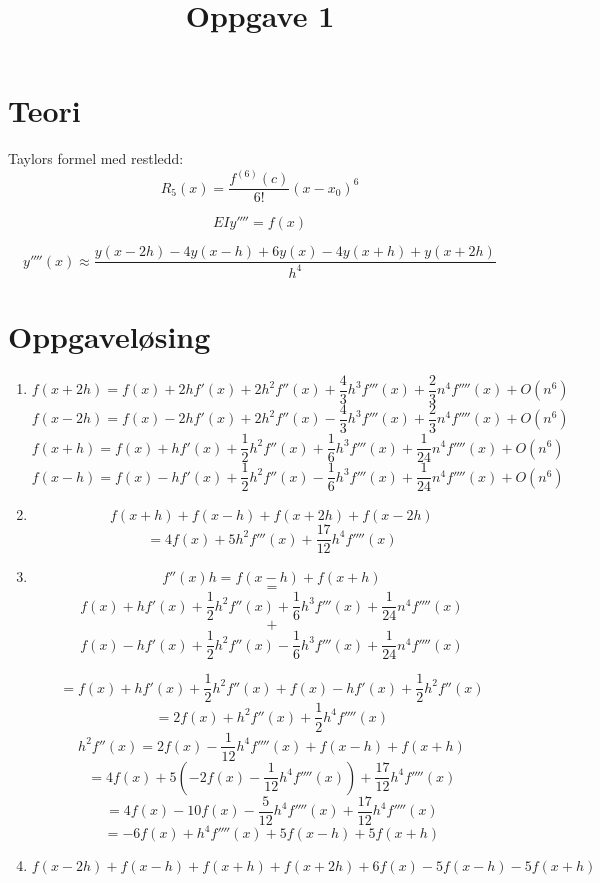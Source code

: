 \documentclass[11pt]{article}
\title{Oppgave 1}
\begin{document}
        \section{Teori}
        Taylors formel med restledd:
        \[R_5(x)= \frac{f^{(6)}(c)} {6!}(x-x_0)^6\]
        
        \[
        EIy''''=f(x)
        \]
        
        \[
            y''''(x) \approx \frac{y(x - 2h)-4y(x - h)+ 6y(x) - 4y(x + h) + y(x + 2h)}{h^4}
        \]

        \section{Oppgaveløsing}

    \begin{enumerate}
        \item \[f(x + 2h) = f(x) + 2hf'(x) + 2h^2f''(x) + \frac{4}{3}h^3f'''(x)+ \frac{2}{3}n^4f''''(x) +O(n^6)\]
         \[f(x - 2h) = f(x) - 2hf'(x) + 2h^2f''(x) - \frac{4}{3}h^3f'''(x)+ \frac{2}{3}n^4f''''(x) +O(n^6)\]
         \[f(x + h) = f(x) + hf'(x) + \frac{1}{2}h^2f''(x) + \frac{1}{6}h^3f'''(x)+ \frac{1}{24}n^4f''''(x) +O(n^6)\]
         \[f(x - h) = f(x) - hf'(x) + \frac{1}{2}h^2f''(x) - \frac{1}{6}h^3f'''(x)+ \frac{1}{24}n^4f''''(x) +O(n^6)\]
        \item \[f(x + h) + f(x - h) + f(x + 2h) + f(x - 2h)\]
        \[= 4f(x) + 5h^2f'''(x) + \frac{17}{12}h^4f''''(x)\]
        \item \[f''(x)h = f(x - h) + f(x + h)\]
        \[=\]
        \[f(x) + hf'(x) + \frac{1}{2}h^2f''(x) + \frac{1}{6}h^3f'''(x)+ \frac{1}{24}n^4f''''(x)\]
        \[+\]
        \[f(x) - hf'(x) + \frac{1}{2}h^2f''(x) - \frac{1}{6}h^3f'''(x)+ \frac{1}{24}n^4f''''(x)\]

        \[= f(x) + hf'(x) + \frac{1}{2}h^2f''(x) + f(x) - hf'(x) + \frac{1}{2}h^2f''(x)\]
        \[= 2f(x) + h^2f''(x) + \frac{1}{2}h^4f''''(x)\]
        \[h^2f''(x) = 2f(x) - \frac{1}{12}h^4f''''(x) + f(x - h) + f(x + h)\]
        \[= 4f(x) + 5(-2f(x)-\frac{1}{12} h^4f''''(x)) + \frac{17}{12}h^4f''''(x)\]
        \[= 4f(x) - 10f(x) - \frac{5}{12}h^4f''''(x) + \frac{17}{12}h^4f''''(x)\]
        \[= -6f(x) + h^4f''''(x) + 5f(x - h) + 5f(x + h)\]
        \item \[f(x - 2h) + f(x - h) + f(x + h) + f(x + 2h) + 6f(x) - 5f(x - h) - 5f(x + h)\]
        
    \end{enumerate}
        

        

        
\end{document}
